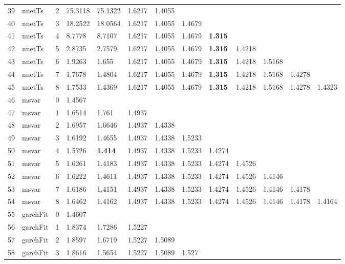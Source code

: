 \documentclass[10pt,a4paper]{article}
\begin{document}
\begin{table}[ht]
\begin{tabular}{rlrllllllllll}
  39 & nnetTs &     2 & 75.3118 & 75.1322 & 1.6217 & 1.4055 &  &  &  &  &  &  \\ 
  40 & nnetTs &     3 & 18.2522 & 18.0564 & 1.6217 & 1.4055 & 1.4679 &  &  &  &  &  \\ 
  41 & nnetTs &     4 & 8.7778 & 8.7107 & 1.6217 & 1.4055 & 1.4679 & \textbf{1.315} &  &  &  &  \\ 
  42 & nnetTs &     5 & 2.8735 & 2.7579 & 1.6217 & 1.4055 & 1.4679 & \textbf{1.315} & 1.4218 &  &  &  \\ 
  43 & nnetTs &     6 & 1.9263 & 1.655 & 1.6217 & 1.4055 & 1.4679 & \textbf{1.315} & 1.4218 & 1.5168 &  &  \\ 
  44 & nnetTs &     7 & 1.7678 & 1.4804 & 1.6217 & 1.4055 & 1.4679 & \textbf{1.315} & 1.4218 & 1.5168 & 1.4278 &  \\ 
  45 & nnetTs &     8 & 1.7533 & 1.4369 & 1.6217 & 1.4055 & 1.4679 & \textbf{1.315} & 1.4218 & 1.5168 & 1.4278 & 1.4323 \\ 
   \hline
46 & msvar &     0 & 1.4567 &  &  &  &  &  &  &  &  &  \\ 
  47 & msvar &     1 & 1.6514 & 1.761 & 1.4937 &  &  &  &  &  &  &  \\ 
  48 & msvar &     2 & 1.6957 & 1.6646 & 1.4937 & 1.4338 &  &  &  &  &  &  \\ 
  49 & msvar &     3 & 1.6192 & 1.4655 & 1.4937 & 1.4338 & 1.5233 &  &  &  &  &  \\ 
  50 & msvar &     4 & 1.5726 & \textbf{1.414} & 1.4937 & 1.4338 & 1.5233 & 1.4274 &  &  &  &  \\ 
  51 & msvar &     5 & 1.6261 & 1.4183 & 1.4937 & 1.4338 & 1.5233 & 1.4274 & 1.4526 &  &  &  \\ 
  52 & msvar &     6 & 1.6222 & 1.4611 & 1.4937 & 1.4338 & 1.5233 & 1.4274 & 1.4526 & 1.4146 &  &  \\ 
  53 & msvar &     7 & 1.6186 & 1.4151 & 1.4937 & 1.4338 & 1.5233 & 1.4274 & 1.4526 & 1.4146 & 1.4178 &  \\ 
  54 & msvar &     8 & 1.6462 & 1.4162 & 1.4937 & 1.4338 & 1.5233 & 1.4274 & 1.4526 & 1.4146 & 1.4178 & 1.4164 \\ 
   \hline
55 & garchFit &     0 & 1.4607 &  &  &  &  &  &  &  &  &  \\ 
  56 & garchFit &     1 & 1.8374 & 1.7286 & 1.5227 &  &  &  &  &  &  &  \\ 
  57 & garchFit &     2 & 1.8597 & 1.6719 & 1.5227 & 1.5089 &  &  &  &  &  &  \\ 
  58 & garchFit &     3 & 1.8616 & 1.5654 & 1.5227 & 1.5089 & 1.527 &  &  &  &  &  \\ 

\end{tabular}
\end{table}
\end{document}

